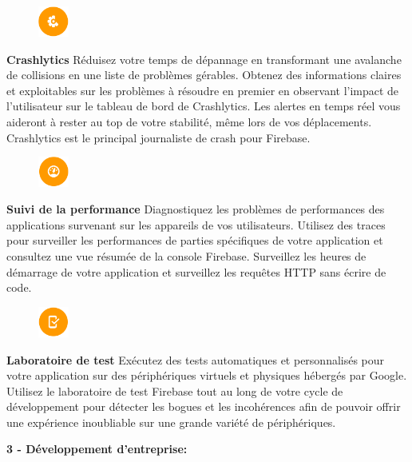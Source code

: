 \begin{figure}
	\includegraphics[width=1cm]{Images/chapter2/firebase_services/crashlytics.png}
\end{figure}
\textbf{Crashlytics} Réduisez votre temps de dépannage en transformant une avalanche de collisions en une liste de problèmes gérables. Obtenez des informations claires et exploitables sur les problèmes à résoudre en premier en observant l'impact de l'utilisateur sur le tableau de bord de Crashlytics. Les alertes en temps réel vous aideront à rester au top de votre stabilité, même lors de vos déplacements. Crashlytics est le principal journaliste de crash pour Firebase.\medskip

\begin{figure}
	\includegraphics[width=1cm]{Images/chapter2/firebase_services/performance_monitoring.png}
\end{figure}
\textbf{Suivi de la performance} Diagnostiquez les problèmes de performances des applications survenant sur les appareils de vos utilisateurs. Utilisez des traces pour surveiller les performances de parties spécifiques de votre application et consultez une vue résumée de la console Firebase. Surveillez les heures de démarrage de votre application et surveillez les requêtes HTTP sans écrire de code.\medskip

\begin{figure}
	\includegraphics[width=1cm]{Images/chapter2/firebase_services/test_lab.png}
\end{figure}
\textbf{Laboratoire de test} Exécutez des tests automatiques et personnalisés pour votre application sur des périphériques virtuels et physiques hébergés par Google. Utilisez le laboratoire de test Firebase tout au long de votre cycle de développement pour détecter les bogues et les incohérences afin de pouvoir offrir une expérience inoubliable sur une grande variété de périphériques.\bigskip

\longtab \textbf{3 - Développement d'entreprise:}\bigskip

